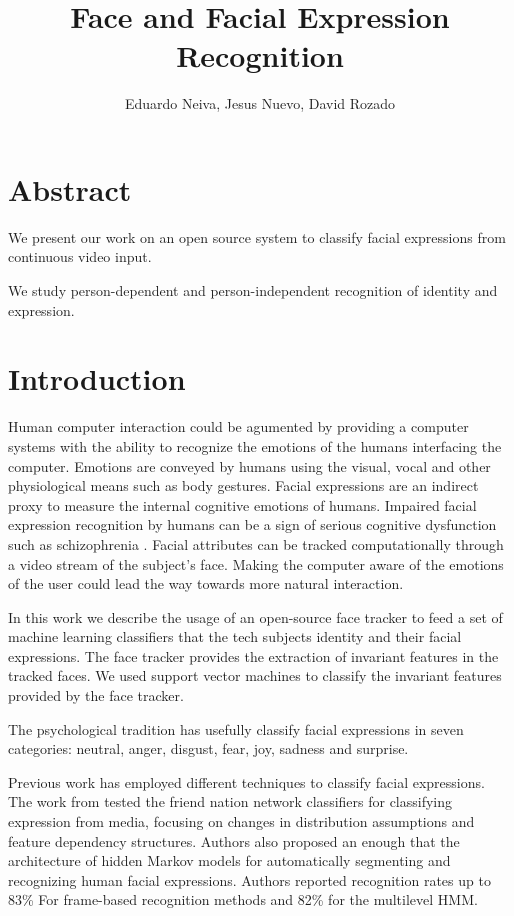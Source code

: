 \documentclass[]{article}
\title{Face and Facial Expression Recognition}
\author{Eduardo Neiva, Jesus Nuevo, David Rozado}
\begin{document}
\maketitle

\section{Abstract}
We present our work on an open source system to classify facial expressions from continuous video input.

We study person-dependent and person-independent recognition of identity and expression.

\section{Introduction}
Human computer interaction could be agumented by providing a computer systems with the ability to recognize the emotions
of the humans interfacing the computer. Emotions are conveyed by humans  using the visual, vocal and other physiological
means such as body gestures. Facial expressions are an indirect proxy to measure the internal cognitive emotions of
humans. Impaired facial expression recognition by humans can be a sign of serious cognitive dysfunction such as
schizophrenia \cite{Edwards2002789}.  Facial attributes can be tracked computationally through a video stream of the
subject's face. Making the computer aware of the emotions of the user could lead the way towards more natural interaction.


In this work we describe the usage of an open-source face tracker to feed a set of machine learning classifiers that the
tech subjects identity and their facial expressions. The face tracker provides the extraction of invariant features in
the tracked faces. We used support vector machines  to classify the invariant features provided by the face tracker.


The psychological tradition has usefully classify facial expressions in seven categories: neutral, anger, disgust, fear,
joy, sadness and surprise.


Previous work has employed different techniques to classify  facial expressions. The work from \cite{Cohen2003160}
tested the friend nation network classifiers for classifying expression from media, focusing on changes in distribution
assumptions and feature dependency structures. Authors also proposed an enough that the architecture of hidden Markov
models for automatically segmenting and recognizing human facial expressions. Authors reported recognition rates up to
83\% For frame-based recognition methods and 82\% for the multilevel HMM. 
 
\end{document}
